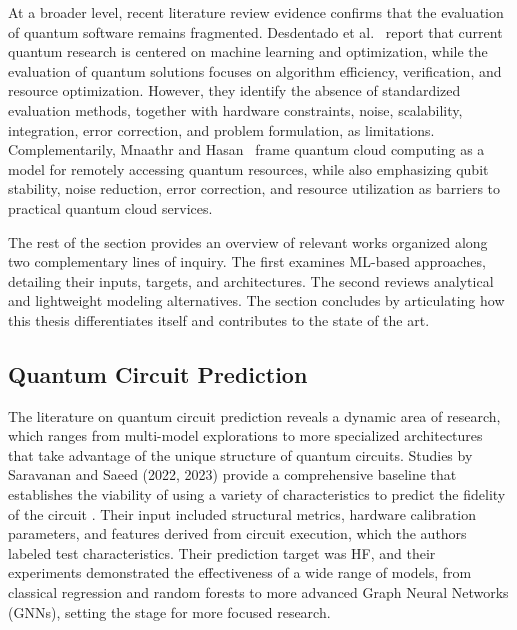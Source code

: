 \documentclass{article}
\begin{document}
At a broader level, recent literature review evidence confirms that the evaluation of quantum software remains fragmented. Desdentado et al.~\cite{desdentadoQuantumComputingSoftware_2025} report that current quantum research is centered on machine learning and optimization, while the evaluation of quantum solutions focuses on algorithm efficiency, verification, and resource optimization. However, they identify the absence of standardized evaluation methods, together with hardware constraints, noise, scalability, integration, error correction, and problem formulation, as limitations. Complementarily, Mnaathr and Hasan~\cite{mnaathrIntegratingQuantumComputing} frame quantum cloud computing as a model for remotely accessing quantum resources, while also emphasizing qubit stability, noise reduction, error correction, and resource utilization as barriers to practical quantum cloud services.

The rest of the section provides an overview of relevant works organized along two complementary lines of inquiry. The first examines ML-based approaches, detailing their inputs, targets, and architectures. The second reviews analytical and lightweight modeling alternatives. The section concludes by articulating how this thesis differentiates itself and contributes to the state of the art.

\subsection{Quantum Circuit Prediction}
\label{subsection:qcp}

The literature on quantum circuit prediction reveals a dynamic area of research, which ranges from multi-model explorations to more specialized architectures that take advantage of the unique structure of quantum circuits. Studies by Saravanan and Saeed (2022, 2023) provide a comprehensive baseline that establishes the viability of using a variety of characteristics to predict the fidelity of the circuit \cite{saravananMachineLearningQuantum_2022, saravananDataDrivenReliabilityModelsa_2023}. Their input included structural metrics, hardware calibration parameters, and features derived from circuit execution, which the authors labeled test characteristics. Their prediction target was HF, and their experiments demonstrated the effectiveness of a wide range of models, from classical regression and random forests to more advanced Graph Neural Networks (GNNs), setting the stage for more focused research.
\end{document}
